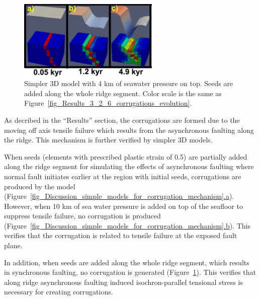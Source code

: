 \begin{figure}[h]
  \centering
    \includegraphics[width=0.6\textwidth]{./Figures/fig_Discussion_Observation_6_Corrugation_simplerModel_4kwaterdepth_along_ridge_seed.eps}
  \caption[Simpler 3D model with 4 km of seawater pressure on top. Seeds are added along the whole ridge segment.]{Simpler 3D model with 4 km of seawater pressure on top. Seeds are added along the whole ridge segment. Color scale is the same as Figure~\hyperref[fig_Results_3_2_6_corrugations_evolution]{\ref{fig_Results_3_2_6_corrugations_evolution}}.}
 \label{fig_Discussion_Observation_6_Corrugation_simplerModel_4kwaterdepth_along_ridge_seed}
\end{figure}   

As decribed in the ``Results'' section, the corrugations are formed due to the moving off axis tensile failure which results from the asynchronous faulting along the ridge. This mechanism is further verified by simpler 3D models.

When seeds (elements with prescribed plastic strain of 0.5) are partially added along the ridge segment for simulating the effects of asynchronous faulting where normal fault initiates earlier at the region with initial seeds, corrugations are produced by the model (Figure~\hyperref[fig_Discussion_simple_models_for_corrugation_mechanism]{\ref{fig_Discussion_simple_models_for_corrugation_mechanism}.a}). 
However, when 10 km of sea water pressure is added on top of the seafloor to suppress tensile failure, no corrugation is produced (Figure~\hyperref[fig_Discussion_simple_models_for_corrugation_mechanism]{\ref{fig_Discussion_simple_models_for_corrugation_mechanism}.b}). This verifies that the corrugation is related to tensile failure at the exposed fault plane.

In addition, when seeds are added along the whole ridge segment, which results in synchronous faulting, no corrugation is generated (Figure~\hyperref[fig_Discussion_Observation_6_Corrugation_simplerModel_4kwaterdepth_along_ridge_seed]{\ref{fig_Discussion_Observation_6_Corrugation_simplerModel_4kwaterdepth_along_ridge_seed}}). This verifies that along ridge asynchronous faulting induced isochron-parallel tensional stress is necessary for creating corrugations.

